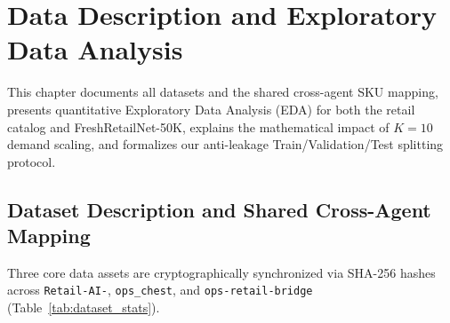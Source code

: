 \chapter{Data Description and Exploratory Data Analysis}

This chapter documents all datasets and the shared cross-agent SKU mapping, presents quantitative Exploratory Data Analysis (EDA) for both the retail catalog and FreshRetailNet-50K, explains the mathematical impact of $K=10$ demand scaling, and formalizes our anti-leakage Train/Validation/Test splitting protocol.

\section{Dataset Description and Shared Cross-Agent Mapping}

Three core data assets are cryptographically synchronized via SHA-256 hashes across \texttt{Retail-AI-}, \texttt{ops\_chest}, and \texttt{ops-retail-bridge} (Table~\ref{tab:dataset_stats}).

